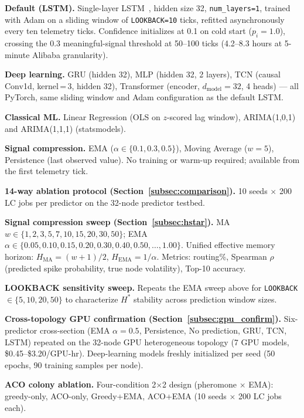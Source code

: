 \documentclass[conference]{IEEEtran}
\begin{document}
\textbf{Default (LSTM).} Single-layer LSTM~\cite{hochreiter1997lstm},
hidden size 32, \texttt{num\_layers=1}, trained with Adam on a sliding
window of \texttt{LOOKBACK=10} ticks, refitted asynchronously every ten
telemetry ticks. Confidence initializes at 0.1 on cold start ($p_i = 1.0$),
crossing the 0.3 meaningful-signal threshold at 50--100 ticks
(4.2--8.3 hours at 5-minute Alibaba granularity).

\textbf{Deep learning.} GRU (hidden 32), MLP (hidden 32, 2 layers),
TCN (causal Conv1d, kernel\,=\,3, hidden 32), Transformer (encoder,
$d_{\text{model}}{=}32$, 4 heads) --- all PyTorch, same sliding window
and Adam configuration as the default LSTM.

\textbf{Classical ML.} Linear Regression (OLS on $z$-scored lag window),
ARIMA(1,0,1) and ARIMA(1,1,1) (statsmodels).

\textbf{Signal compression.} EMA ($\alpha \in \{0.1, 0.3, 0.5\}$),
Moving Average ($w{=}5$), Persistence (last observed value). No training
or warm-up required; available from the first telemetry tick.

\textbf{14-way ablation protocol (Section~\ref{subsec:comparison}).}
10 seeds $\times$ 200 LC jobs per predictor on the 32-node predictor
testbed.

\textbf{Signal compression sweep (Section~\ref{subsec:hstar}).}
MA $w \in \{1,2,3,5,7,10,15,20,30,50\}$;
EMA $\alpha \in \{0.05, 0.10, 0.15, 0.20, 0.30, 0.40, 0.50, \ldots, 1.00\}$.
Unified effective memory horizon: $H_{\text{MA}} = (w{+}1)/2$,
$H_{\text{EMA}} = 1/\alpha$. Metrics: routing\%, Spearman
$\rho$(predicted spike probability, true node volatility), Top-10 accuracy.

\textbf{LOOKBACK sensitivity sweep.} Repeats the EMA sweep above for
\texttt{LOOKBACK} $\in \{5, 10, 20, 50\}$ to characterize $H^*$
stability across prediction window sizes.

\textbf{Cross-topology GPU confirmation (Section~\ref{subsec:gpu_confirm}).}
Six-predictor cross-section (EMA $\alpha{=}0.5$, Persistence, No
prediction, GRU, TCN, LSTM) repeated on the 32-node GPU heterogeneous
topology (7 GPU models, \$0.45--\$3.20/GPU-hr). Deep-learning models
freshly initialized per seed (50 epochs, 90 training samples per node).

\textbf{ACO colony ablation.} Four-condition 2$\times$2 design (pheromone
$\times$ EMA): greedy-only, ACO-only, Greedy+EMA, ACO+EMA
(10 seeds $\times$ 200 LC jobs each).


\end{document}
